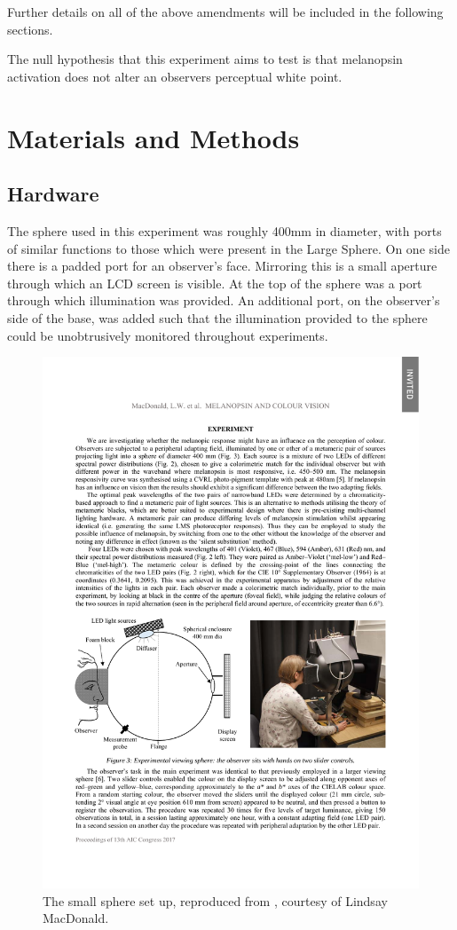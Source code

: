 Further details on all of the above amendments will be included in the following sections. 

The null hypothesis that this experiment aims to test is that melanopsin activation does not alter an observers perceptual white point.

\section{Materials and Methods}

\subsection{Hardware}

The sphere used in this experiment was roughly 400mm in diameter, with ports of similar functions to those which were present in the Large Sphere. On one side there is a padded port for an observer's face. Mirroring this is a small aperture through which an LCD screen is visible. At the top of the sphere was a port through which illumination was provided. An additional port, on the observer's side of the base, was added such that the illumination provided to the sphere could be unobtrusively monitored throughout experiments.

\begin{figure}[htbp]
\includegraphics[max width=\textwidth,center]{figs/SmallSphere/diagram.pdf}
\caption{The small sphere set up, reproduced from \citet{macdonald_melanopsin_2017}, courtesy of Lindsay MacDonald.}
\label{fig:diagram}
\end{figure}

